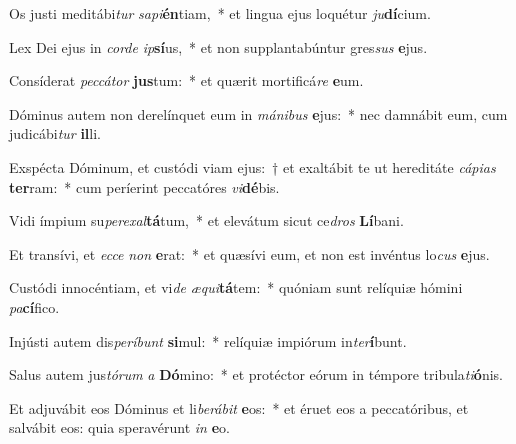 \item Os justi meditábi\textit{tur} \textit{sa}\textit{pi}\textbf{én}tiam,~* et lingua ejus loquétur \textit{ju}\textbf{dí}cium.
\item Lex Dei ejus in \textit{cor}\textit{de} \textit{ip}\textbf{sí}us,~* et non supplantabúntur gres\textit{sus} \textbf{e}jus.
\item Consíderat \textit{pec}\textit{cá}\textit{tor} \textbf{jus}tum:~* et quærit mortificá\textit{re} \textbf{e}um.
\item Dóminus autem non derelínquet eum in \textit{má}\textit{ni}\textit{bus} \textbf{e}jus:~* nec damnábit eum, cum judicábi\textit{tur} \textbf{il}li.
\item Exspécta Dóminum, et custódi viam ejus:~† et exaltábit te ut hereditáte \textit{cá}\textit{pi}\textit{as} \textbf{ter}ram:~* cum períerint peccatóres \textit{vi}\textbf{dé}bis.
\item Vidi ímpium su\textit{per}\textit{ex}\textit{al}\textbf{tá}tum,~* et elevátum sicut ce\textit{dros} \textbf{Lí}bani.
\item Et transívi, et \textit{ec}\textit{ce} \textit{non} \textbf{e}rat:~* et quæsívi eum, et non est invéntus lo\textit{cus} \textbf{e}jus.
\item Custódi innocéntiam, et vi\textit{de} \textit{æ}\textit{qui}\textbf{tá}tem:~* quóniam sunt relíquiæ hómini \textit{pa}\textbf{cí}fico.
\item Injústi autem dis\textit{per}\textit{í}\textit{bunt} \textbf{si}mul:~* relíquiæ impiórum in\textit{ter}\textbf{í}bunt.
\item Salus autem jus\textit{tó}\textit{rum} \textit{a} \textbf{Dó}mino:~* et protéctor eórum in témpore tribula\textit{ti}\textbf{ó}nis.
\item Et adjuvábit eos Dóminus et li\textit{be}\textit{rá}\textit{bit} \textbf{e}os:~* et éruet eos a peccatóribus, et salvábit eos: quia speravérunt \textit{in} \textbf{e}o.
